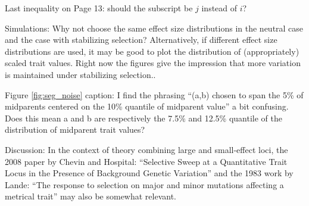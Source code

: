\reply{
}

\begin{point}{\revref}
    Last inequality on Page 13: should the subscript be $j$ instead of $i$?
\end{point}


\begin{point}{}
    Simulations: Why not choose the same effect size distributions in the neutral case and the case with stabilizing selection? Alternatively, if different effect size distributions are used, it may be good to plot the distribution of (appropriately) scaled trait values. Right now the figures give the impression that more variation is maintained under stabilizing selection..
\end{point}


\begin{point}{}
    Figure \ref{fig:seg_noise} caption: I find the phrasing ``(a,b) chosen to span the 5\% of midparents centered on the 10\% quantile of midparent value'' a bit confusing. Does this mean a and b are respectively the 7.5\% and 12.5\% quantile of the distribution of midparent trait values?
\end{point}


\begin{point}{}
    Discussion: In the context of theory combining large and small-effect loci, the 2008 paper by Chevin and Hospital: ``Selective Sweep at a Quantitative Trait Locus in the Presence of Background Genetic Variation'' and the 1983 work by Lande: ``The response to selection on major and minor mutations affecting a metrical trait'' may also be somewhat relevant.
\end{point}

\reply{
}


